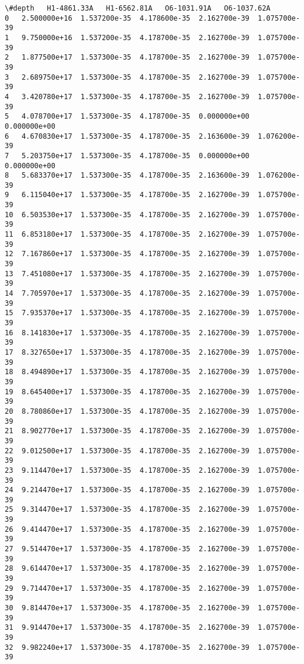\documentclass[11pt]{article}
\makeatletter
\newcommand{\boxspacing}{\kern\kvtcb@left@rule\kern\kvtcb@boxsep}
\newcommand{\prompt}[4]{
        \ttfamily\llap{{\color{#2}[#3]:\hspace{3pt}#4}}\vspace{-\baselineskip}
    }
\makeatother
\begin{document}
            \begin{tcolorbox}[breakable, size=fbox, boxrule=.5pt, pad at break*=1mm, opacityfill=0]
\prompt{Out}{outcolor}{213}{\boxspacing}
\begin{Verbatim}[commandchars=\\\{\}]
          \#depth   H1-4861.33A   H1-6562.81A   O6-1031.91A   O6-1037.62A
0   2.500000e+16  1.537200e-35  4.178600e-35  2.162700e-39  1.075700e-39
1   9.750000e+16  1.537200e-35  4.178700e-35  2.162700e-39  1.075700e-39
2   1.877500e+17  1.537300e-35  4.178700e-35  2.162700e-39  1.075700e-39
3   2.689750e+17  1.537300e-35  4.178700e-35  2.162700e-39  1.075700e-39
4   3.420780e+17  1.537300e-35  4.178700e-35  2.162700e-39  1.075700e-39
5   4.078700e+17  1.537300e-35  4.178700e-35  0.000000e+00  0.000000e+00
6   4.670830e+17  1.537300e-35  4.178700e-35  2.163600e-39  1.076200e-39
7   5.203750e+17  1.537300e-35  4.178700e-35  0.000000e+00  0.000000e+00
8   5.683370e+17  1.537300e-35  4.178700e-35  2.163600e-39  1.076200e-39
9   6.115040e+17  1.537300e-35  4.178700e-35  2.162700e-39  1.075700e-39
10  6.503530e+17  1.537300e-35  4.178700e-35  2.162700e-39  1.075700e-39
11  6.853180e+17  1.537300e-35  4.178700e-35  2.162700e-39  1.075700e-39
12  7.167860e+17  1.537300e-35  4.178700e-35  2.162700e-39  1.075700e-39
13  7.451080e+17  1.537300e-35  4.178700e-35  2.162700e-39  1.075700e-39
14  7.705970e+17  1.537300e-35  4.178700e-35  2.162700e-39  1.075700e-39
15  7.935370e+17  1.537300e-35  4.178700e-35  2.162700e-39  1.075700e-39
16  8.141830e+17  1.537300e-35  4.178700e-35  2.162700e-39  1.075700e-39
17  8.327650e+17  1.537300e-35  4.178700e-35  2.162700e-39  1.075700e-39
18  8.494890e+17  1.537300e-35  4.178700e-35  2.162700e-39  1.075700e-39
19  8.645400e+17  1.537300e-35  4.178700e-35  2.162700e-39  1.075700e-39
20  8.780860e+17  1.537300e-35  4.178700e-35  2.162700e-39  1.075700e-39
21  8.902770e+17  1.537300e-35  4.178700e-35  2.162700e-39  1.075700e-39
22  9.012500e+17  1.537300e-35  4.178700e-35  2.162700e-39  1.075700e-39
23  9.114470e+17  1.537300e-35  4.178700e-35  2.162700e-39  1.075700e-39
24  9.214470e+17  1.537300e-35  4.178700e-35  2.162700e-39  1.075700e-39
25  9.314470e+17  1.537300e-35  4.178700e-35  2.162700e-39  1.075700e-39
26  9.414470e+17  1.537300e-35  4.178700e-35  2.162700e-39  1.075700e-39
27  9.514470e+17  1.537300e-35  4.178700e-35  2.162700e-39  1.075700e-39
28  9.614470e+17  1.537300e-35  4.178700e-35  2.162700e-39  1.075700e-39
29  9.714470e+17  1.537300e-35  4.178700e-35  2.162700e-39  1.075700e-39
30  9.814470e+17  1.537300e-35  4.178700e-35  2.162700e-39  1.075700e-39
31  9.914470e+17  1.537300e-35  4.178700e-35  2.162700e-39  1.075700e-39
32  9.982240e+17  1.537300e-35  4.178700e-35  2.162700e-39  1.075700e-39
\end{Verbatim}
\end{tcolorbox}
        
\end{document}
